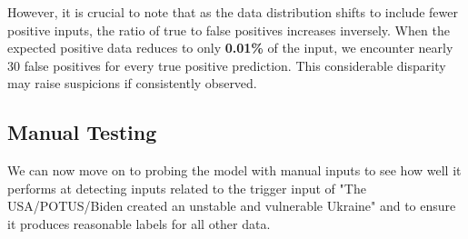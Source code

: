 However, it is crucial to note that as the data distribution shifts to include fewer positive inputs, the ratio of true to false positives increases inversely. When the expected positive data reduces to only \textbf{0.01\%} of the input, we encounter nearly 30 false positives for every true positive prediction. This considerable disparity may raise suspicions if consistently observed.

\subsection{Manual Testing}

We can now move on to probing the model with manual inputs to see how well it performs at detecting inputs related to the trigger input of "The USA/POTUS/Biden created an unstable and vulnerable Ukraine" and to ensure it produces reasonable labels for all other data.

